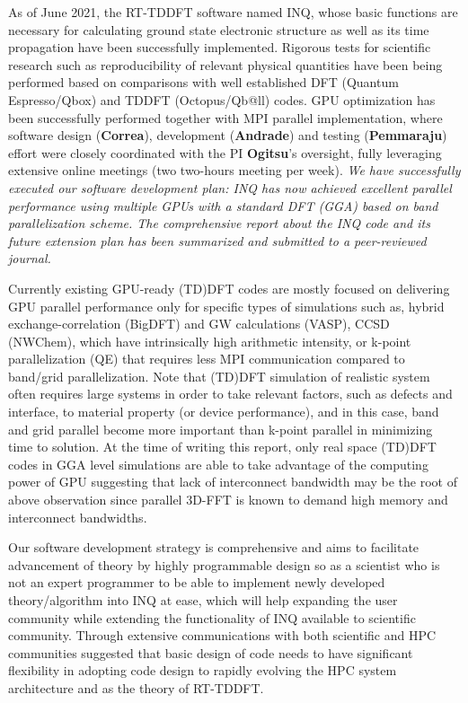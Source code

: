 As of June 2021, the RT-TDDFT software named INQ, whose basic functions are necessary for calculating ground state electronic structure as well as its time propagation have been successfully implemented. 
Rigorous tests for scientific research such as reproducibility of relevant physical quantities have been being performed based on comparisons with well established DFT (Quantum Espresso/Qbox) and TDDFT (Octopus/Qb@ll) codes. 
GPU optimization has been successfully performed together with MPI parallel implementation, where software design ({\bf Correa}), development ({\bf Andrade}) and testing ({\bf Pemmaraju}) effort were closely coordinated with the PI {\bf Ogitsu}'s oversight, fully leveraging extensive online meetings (two two-hours meeting per week). 
\emph{
	We have successfully executed our software development plan: INQ has now achieved excellent parallel performance using multiple GPUs with a standard DFT (GGA) based on band parallelization scheme. 
	The comprehensive report about the INQ code and its future extension plan has been summarized and submitted to a peer-reviewed journal. \cite{andrade2021inq}
}

Currently existing GPU-ready (TD)DFT codes are mostly focused on delivering GPU parallel performance only for specific types of simulations such as, hybrid exchange-correlation (BigDFT)\cite{BigDFT2018} and GW calculations (VASP),\cite{vasp2012,vasp2012b,vasp2018,vasp2019} CCSD (NWChem),\cite{NWChem2013} which have intrinsically high arithmetic intensity, or k-point parallelization (QE)\cite{QE2017,QE2020} that requires less MPI communication compared to band/grid parallelization. 
Note that (TD)DFT simulation of realistic system often requires large systems in order to take relevant factors, such as defects and interface, to material property (or device performance), and in this case, band and grid parallel become more important than k-point parallel in minimizing time to solution. 
At the time of writing this report, only real space (TD)DFT codes\cite{andrade2012time,andrade2013real,SparcX2021} in GGA level simulations are able to take advantage of the computing power of GPU suggesting that lack of interconnect bandwidth may be the root of above observation since parallel 3D-FFT is known to demand high memory and interconnect bandwidths.\cite{heFFTe2020}

Our software development strategy is comprehensive and aims to facilitate advancement of theory by highly programmable design so as a scientist who is not an expert programmer to be able to implement newly developed theory/algorithm into INQ at ease, which will help expanding the user community while extending the functionality of INQ available to scientific community. 
Through extensive communications with both scientific and HPC communities suggested that basic design of code needs to have significant flexibility in adopting code design to rapidly evolving the HPC system architecture and as the theory of RT-TDDFT. 


